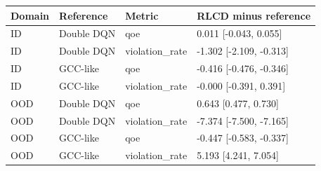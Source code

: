 \begin{tabular}{llll}
\toprule
Domain & Reference & Metric & RLCD minus reference \\
\midrule
ID & Double DQN & qoe & 0.011 [-0.043, 0.055] \\
ID & Double DQN & violation\_rate & -1.302 [-2.109, -0.313] \\
ID & GCC-like & qoe & -0.416 [-0.476, -0.346] \\
ID & GCC-like & violation\_rate & -0.000 [-0.391, 0.391] \\
OOD & Double DQN & qoe & 0.643 [0.477, 0.730] \\
OOD & Double DQN & violation\_rate & -7.374 [-7.500, -7.165] \\
OOD & GCC-like & qoe & -0.447 [-0.583, -0.337] \\
OOD & GCC-like & violation\_rate & 5.193 [4.241, 7.054] \\
\bottomrule
\end{tabular}
